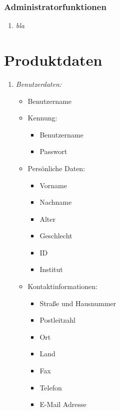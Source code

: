 \documentclass[parskip=full,11pt]{scrartcl}
\def\threedigits#1{%
  \ifnum#1<10 0\fi
  \ifnum#1<1 0\fi
  \number#1}
\begin{document}
\subsubsection{Administratorfunktionen}
\begin{enumerate}[label={\textbf{/F\protect\threedigits{\theenumi}0/}}, leftmargin=*, resume]
\item \textit{bla}
\end{enumerate}

\section{Produktdaten}
\begin{enumerate}[label={\textbf{/D\protect\threedigits{\theenumi}0/}}, leftmargin=*]
\subsubsection{Personendaten}
\item \textit{Benutzerdaten:}
\begin{itemize}
   \item Benutzername
   
   \item Kennung:
   \begin{itemize}
     \item Benutzername
     \item Passwort
   \end{itemize}
 
   \item Persönliche Daten:
   \begin{itemize}
     \item Vorname
     \item Nachname
     \item Alter
     \item Geschlecht
     \item ID
     \item Institut 
   \end{itemize}
   
    \item Kontaktinformationen:
   \begin{itemize}
     \item Straße und Hausnummer
     \item Postleitzahl 
     \item Ort
     \item Land
     \item Fax
     \item Telefon
     \item E-Mail Adresse  
   \end{itemize}
   

\end{itemize}
\end{enumerate}
\end{document}
